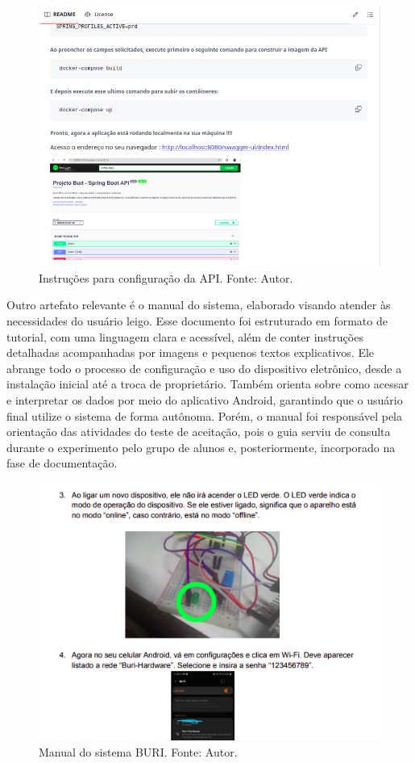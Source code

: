 \begin{figure}[ht]
    \centering
    \includegraphics[width=.60\textwidth]{img/github-tcc-readme-api.png}
    \caption{Instruções para configuração da API. Fonte: Autor.}\label{figGithubAPI}
\end{figure}

Outro artefato relevante é o manual do sistema, elaborado visando atender às necessidades do usuário leigo. Esse documento foi estruturado em formato de tutorial, com uma linguagem clara e acessível, além de 
conter instruções detalhadas acompanhadas por imagens e pequenos textos explicativos. Ele abrange todo o processo de configuração e uso do dispositivo eletrônico, desde a instalação inicial até a troca de proprietário. Também 
orienta sobre como acessar e interpretar os dados por meio do aplicativo Android, garantindo que o usuário final utilize o sistema de forma autônoma. Porém, o manual foi responsável 
pela orientação das atividades do teste de aceitação, pois o guia serviu de consulta durante o experimento pelo grupo de alunos e, posteriormente, incorporado na fase de documentação.

\begin{figure}[ht]
    \centering
    \includegraphics[width=.60\textwidth]{img/documentacao-manual.png}
    \caption{Manual do sistema BURI. Fonte: Autor.}\label{figGithubManual}
\end{figure}